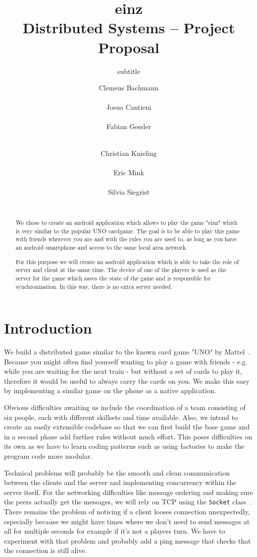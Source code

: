 \documentclass{sig-alternate}
\title{einz\\
\normalsize{Distributed Systems -- Project Proposal}}
\subtitle{subtitle}
\author{
\alignauthor
\normalsize{Clemens Bachmann}\\
	\affaddr{\normalsize{13-932-488}}\\
	\email{\normalsize{baclemen@student.ethz.ch}}
%
\alignauthor
\normalsize{Josua Cantieni}\\
	\affaddr{\normalsize{15-919-038}}\\
	\email{\normalsize{josuac@student.ethz.ch}}
%
\alignauthor
\normalsize{Fabian Gessler}\\
	\affaddr{\normalsize{15-939-341}}\\
	\email{\normalsize{fgessler@student.ethz.ch}}
\and
\alignauthor
\normalsize{Christian Knieling}\\
	\affaddr{\normalsize{ 14-923-809}}\\
	\email{\normalsize{knielinc@student.ethz.ch}}
%
\alignauthor
\normalsize{Eric Mink}\\
	\affaddr{\normalsize{15-917-057}}\\
	\email{\normalsize{minker@student.ethz.ch}}
%
\alignauthor
\normalsize{Silvia Siegrist}\\
	\affaddr{\normalsize{15-935-893}}\\
	\email{\normalsize{sisilvia@student.ethz.ch}}
}
\begin{document}
\maketitle

\begin{abstract}
We chose to create an android application which allows to play the game "einz" which is very similar to the popular UNO cardgame. The goal is to be able to play this game with friends wherever you are and with the rules you are used to, as long as you have an android smartphone and access to the same local area network.

For this purpose we will create an android application which is able to take the role of server and client at the same time. The device of one of the players is used as the server for the game which saves the state of the game and is responsible for synchronization. In this way, there is no extra server needed.
\end{abstract}

\section{Introduction}
We build a distributed game similar to the known card game "UNO" by Mattel~\cite{unoshop}. Because you might often find yourself wanting to play a game with friends - e.g. while you are waiting for the next train - but without a set of cards to play it, therefore it would be useful to always carry the cards on you. We make this easy by implementing a similar game on the phone as a native application.

Obvious difficulties awaiting us include the coordination of a team consisting of six people, each with different skillsets and time available.
Also, we intend to create an easily extensible codebase so that we can first build the base game and in a second phase add further rules without much effort. This poses difficulties on its own as we have to learn coding patterns such as using factories to make the program code more modular.

Technical problems will probably be the smooth and clean communication between the clients and the server and implementing concurrency within the server itself. For the networking difficulties like message ordering and making sure the peers actually get the messages, we will rely on TCP using the \verb|Socket| class~\cite{socketdoc}. There remains the problem of noticing if a client looses connection unexpectedly, especially because we might have times where we don't need to send messages at all for multiple seconds for example if it's not a players turn. We have to experiment with that problem and probably add a ping message that checks that the connection is still alive.
\end{document}
